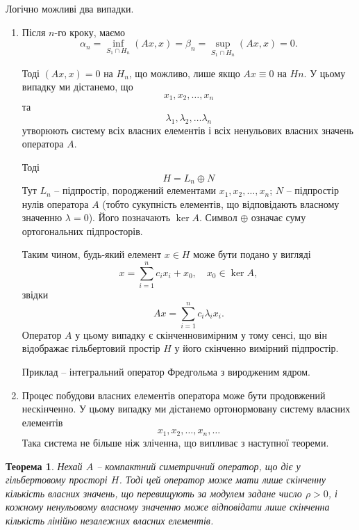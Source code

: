 \documentclass[14pt,twoside]{extreport}
\theoremstyle{mystyle}
\newtheorem{thm}{Теорема}
\numberwithin{equation}{chapter}
\begin{document}
Логічно можливі два випадки.
\begin{enumerate}
 \item Після $n$-го кроку, маємо
\[
 \alpha_n = \inf\limits_{S_1 \cap H_n} (Ax, x) = \beta_n = \sup\limits_{S_1 \cap H_n} (Ax, x) = 0.
\]

Тоді $(Ax, x) = 0$ на $H_n$, що можливо, лише якщо $Ax \equiv 0$ на $Hn$. У цьому випадку ми дістанемо, що
\[
 x_1, x_2, \ldots, x_n
\]
та
\[
 \lambda_1, \lambda_2, \ldots \lambda_n
\]
утворюють систему всіх власних елементів і всіх ненульових власних значень оператора $A$.

Тоді
\[
 H = L_n \oplus N
\]
Тут $L_n$ -- підпростір, породжений елементами $x_1, x_2, \ldots, x_n$; $N$ -- підпростір нулів оператора $A$ (тобто сукупність елементів, що відповідають власному значенню $\lambda = 0$). Його позначають $\ker A$. Символ $\oplus$ означає суму ортогональних підпросторів.

Таким чином, будь-який елемент $x \in H$ може бути подано у вигляді
\[
 x= \sum_{i=1}^{n} c_i x_i + x_0, \quad x_0 \in \ker A,
\]
звідки
\[
 Ax = \sum_{i=1}^{n} c_i \lambda_i x_i.
\]
Оператор $A$ у цьому випадку є скінченновимірним у тому сенсі, що він відображає гільбертовий простір $H$ у його скінченно вимірний підпростір.

Приклад -- інтегральний оператор Фредгольма з виродженим ядром.

\item Процес побудови власних елементів оператора може бути продовжений нескінченно. У цьому випадку ми дістанемо ортонормовану систему власних елементів
\[
 x_1, x_2, \ldots , x_n, \ldots
\]
Така система не більше ніж зліченна, що випливає з наступної теореми.
\end{enumerate}

\begin{thm}
 Нехай $A$ -- компактний симетричний оператор, що діє у гільбертовому просторі $H$. Тоді цей оператор може мати лише скінченну кількість власних значень, що перевищують за модулем задане число $\rho > 0$, і кожному ненульовому власному значенню може відповідати лише скінченна кількість лінійно незалежних власних елементів.
\end{thm}
\end{document}
